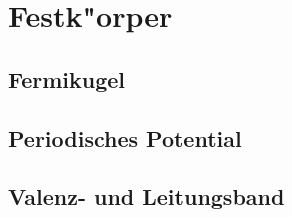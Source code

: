 \chapter{Festk"orper\label{chapter:festkoerper}}
\rhead{}

\section{Fermikugel}
\section{Periodisches Potential}
\section{Valenz- und Leitungsband}
